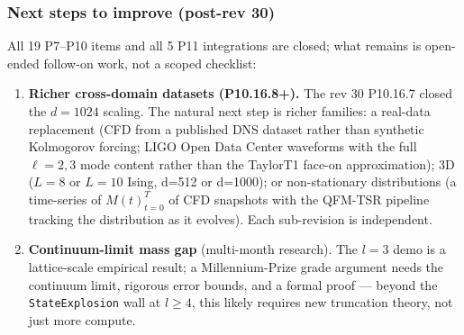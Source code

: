 \documentclass[11pt, a4paper]{article}
\begin{document}
\subsubsection*{Next steps to improve (post-rev 30)}

All 19 P7--P10 items and all 5 P11 integrations are closed; what remains
is open-ended follow-on work, not a scoped checklist:

\begin{enumerate}
\item \textbf{Richer cross-domain datasets (P10.16.8+).} The rev 30
  P10.16.7 closed the $d=1024$ scaling. The natural next step is
  richer families: a real-data replacement (CFD from a published DNS
  dataset rather than synthetic Kolmogorov forcing; LIGO Open Data
  Center waveforms with the full $\ell=2,3$ mode content rather
  than the TaylorT1 face-on approximation); 3D ($L=8$ or $L=10$
  Ising, d=512 or d=1000); or non-stationary distributions (a
  time-series of ${M(t)}_{t=0}^{T}$ of CFD snapshots with the
  QFM-TSR pipeline tracking the distribution as it evolves).
  Each sub-revision is independent.

\item \textbf{Continuum-limit mass gap} (multi-month research). The
  $l=3$ demo is a lattice-scale empirical result; a Millennium-Prize
  grade argument needs the continuum limit, rigorous error bounds, and
  a formal proof --- beyond the \texttt{StateExplosion} wall at
  $l\ge 4$, this likely requires new truncation theory, not just more
  compute.


\end{enumerate}
\end{document}
